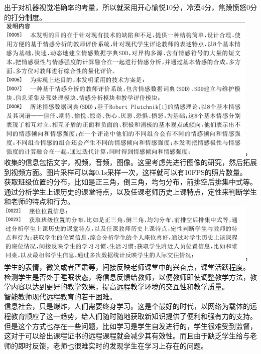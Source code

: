 \documentclass[]{article}
\begin{document}
\begin{CJK}{UTF8}{}
出于对机器视觉准确率的考量，所以就采用开心愉悦10分，冷漠4分，焦躁愤怒0分的打分制度。\\
\includegraphics[width=5in]{pic7}，\\
收集的信息包括文字，视频，音频，图像。这里考虑先进行图像的研究，然后拓展到视频方面。图片采样可以每0.1s采样一次，这样就可以有10FPS的照片数量。\\
获取班级位置的分布，比如是正三角，倒三角，均匀分布，前排空后排集中式等。通过分析学生上课历史的课堂特点，以及任课老师历史上课特点，定性来判断学生和老师的特点和行为。\\
\includegraphics[width=5in]{pic8}，\\
学生的表情，微笑或者严肃等，间接反映老师课堂中的兴奋点，课堂活跃程度。\\
检测学生是否处于睡眠状态，将信息反馈给教师，以便教师即使调整教学方法，教学内容以达到更好的教学效果，提高远程教学环境的交互性和教学质量。\\
智能教师现代远程教育的若干困难。\\
信息社会，只是爆炸，人们需要终身学习。这是个最好的时代，以网络为载体的远程教育顺应了这一趋势，给人们随时随地获取新知识提供了便利和强有力的支持。\\
但是这个方式也存在一些问题，比如学习是学生自发进行的，学生很难受到监督，这对于可以给出课程证书的远程课程就会减少其有效性。而且由于缺乏学生给与老师的即时反馈，老师也很难实时的发现学生在学习上存在的问题。\\

\end{CJK}
\end{document}
